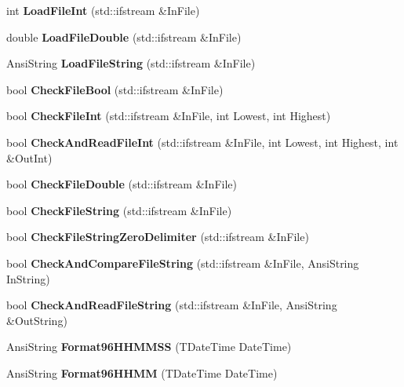 \begin{DoxyCompactItemize}
int {\bfseries Load\+File\+Int} (std\+::ifstream \&In\+File)
\item 
\mbox{\label{class_t_utilities_ac970a0df84f5cb26ed962020b7dc2d6d}} 
double {\bfseries Load\+File\+Double} (std\+::ifstream \&In\+File)
\item 
\mbox{\label{class_t_utilities_a0aac90f10a08736514da3b3e02129e1e}} 
Ansi\+String {\bfseries Load\+File\+String} (std\+::ifstream \&In\+File)
\item 
\mbox{\label{class_t_utilities_a1b39fffcd392bfb0f5a2ca393de3a6bb}} 
bool {\bfseries Check\+File\+Bool} (std\+::ifstream \&In\+File)
\item 
\mbox{\label{class_t_utilities_a4d229af6e8943da1936bcbcc1c83846b}} 
bool {\bfseries Check\+File\+Int} (std\+::ifstream \&In\+File, int Lowest, int Highest)
\item 
\mbox{\label{class_t_utilities_ab4b66aa7480fda73d554fe0bcca82b60}} 
bool {\bfseries Check\+And\+Read\+File\+Int} (std\+::ifstream \&In\+File, int Lowest, int Highest, int \&Out\+Int)
\item 
\mbox{\label{class_t_utilities_a5c7332a6b45894902f271f0ab9ab87db}} 
bool {\bfseries Check\+File\+Double} (std\+::ifstream \&In\+File)
\item 
\mbox{\label{class_t_utilities_a7896a24d025c8164b2c8215944d072aa}} 
bool {\bfseries Check\+File\+String} (std\+::ifstream \&In\+File)
\item 
\mbox{\label{class_t_utilities_a8bc6745e0433d55022e016b6551f04a0}} 
bool {\bfseries Check\+File\+String\+Zero\+Delimiter} (std\+::ifstream \&In\+File)
\item 
\mbox{\label{class_t_utilities_a6a03c1597e2cc5d71c2f88ac36f11363}} 
bool {\bfseries Check\+And\+Compare\+File\+String} (std\+::ifstream \&In\+File, Ansi\+String In\+String)
\item 
\mbox{\label{class_t_utilities_a0a0ef5bf2fc74c0026f2a8bec4151d37}} 
bool {\bfseries Check\+And\+Read\+File\+String} (std\+::ifstream \&In\+File, Ansi\+String \&Out\+String)
\item 
\mbox{\label{class_t_utilities_a2dfbe3d4ed11770bc1a902b51afdc10c}} 
Ansi\+String {\bfseries Format96\+H\+H\+M\+M\+SS} (T\+Date\+Time Date\+Time)
\item 
\mbox{\label{class_t_utilities_a6dc0e83b149563fdf43f068fd26cead8}} 
Ansi\+String {\bfseries Format96\+H\+H\+MM} (T\+Date\+Time Date\+Time)
\end{DoxyCompactItemize}
